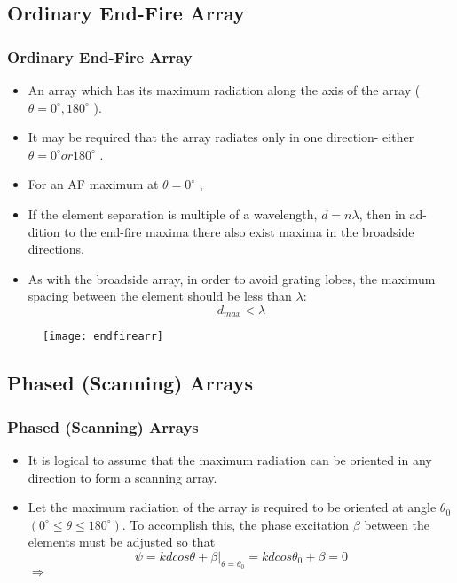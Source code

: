 \documentclass{beamer}
\begin{document}
	\begin{frame}
		\subsection{Ordinary End-Fire Array}
		\frametitle{Ordinary End-Fire Array}
		\begin{itemize}
			\item An array which has its maximum radiation along the	axis of the array ($ \theta = 0^\circ , 180^\circ $ ). 
			\item It may be required that the array radiates only in one direction- either $ \theta = 0^\circ or 180^\circ$ .
			\item[] For an AF maximum at $\theta = 0^\circ$ ,
			\item If the element separation is multiple of a wavelength, $d = n\lambda$, then in ad-
			dition to the end-fire maxima there also exist maxima in the broadside
			directions. 
			\item As with the broadside array, in order to avoid grating lobes, the
			maximum spacing between the element should be less than $\lambda$:
			\begin{equation}
			d_{max} < \lambda
			\end{equation}
		\end{itemize}
	\end{frame}
	\begin{frame}
		\begin{figure}
			\centering
			\texttt{[image: endfirearr]}
			\label{fig:endfirearr}
		\end{figure}
	\end{frame}
	\begin{frame}
		\subsection{Phased (Scanning) Arrays}
		\frametitle{Phased (Scanning) Arrays}
		\begin{itemize}
			\item It is logical to assume that the maximum radiation can be oriented in any direction to form a scanning array. 
			\item Let the maximum radiation of the array is required to be oriented at angle $ \theta_0 $ $ (0^\circ \leq \theta \leq 180^\circ ) $. To accomplish this, the phase excitation
			$\beta$ between the elements must be adjusted so that 
			\begin{equation}
			\psi = kdcos\theta +\beta|_{\theta = \theta_0} = kdcos\theta_0 +\beta = 0\nonumber 
			\end{equation}
			$\Rightarrow$ \boxedeq{}{\beta = -kdcos\theta_0}	
		\end{itemize}
	\end{frame}
\end{document}
